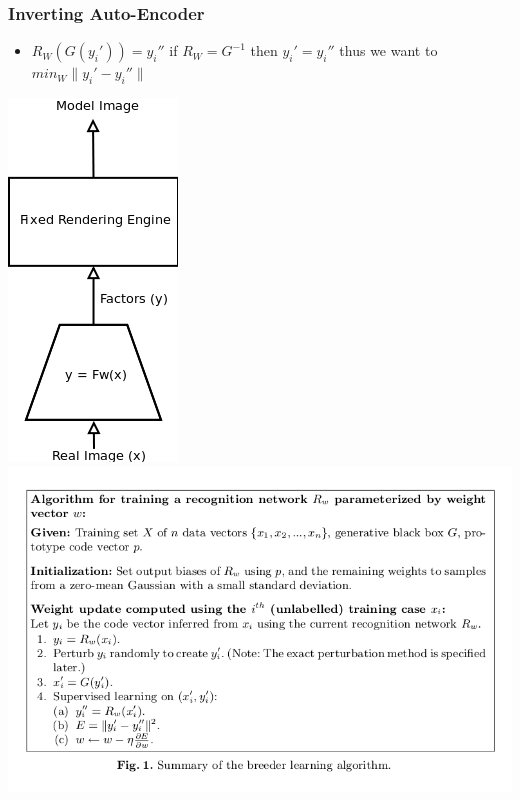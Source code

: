 \documentclass{beamer}
\begin{document}
\begin{frame}
\frametitle{Inverting Auto-Encoder}
\begin{itemize}
\item{$R_W(G(y_i')) = y_i''$ if $R_W = G^{-1}$ then $y_i' = y_i''$ thus we want to $min_W \|y_i'-y_i''\|$} 
\end{itemize} 
\begin{center}
\includegraphics[scale = 0.4]{render.png}
\includegraphics[scale = 0.25]{alg.png}
\end{center}
\end{frame} 
\end{document}
